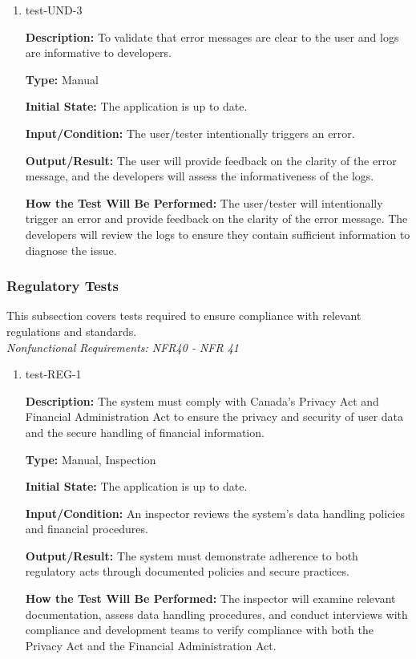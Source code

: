 \documentclass[12pt, titlepage]{article}
\begin{document}
\begin{enumerate}
\item{test-UND-3\\}

\textbf{Description:} To validate that error messages are clear to the user and
logs are informative to developers.

\textbf{Type:} Manual
					
\textbf{Initial State:} The application is up to date.
					
\textbf{Input/Condition:} The user/tester intentionally triggers an error.
					
\textbf{Output/Result:} The user will provide feedback on the clarity of the
error message, and the developers will assess the informativeness of the logs.
					
\textbf{How the Test Will Be Performed:} The user/tester will intentionally
trigger an error and provide feedback on the clarity of the error message. The
developers will review the logs to ensure they contain sufficient information to
diagnose the issue.

\end{enumerate}

\subsubsection{Regulatory Tests}

This subsection covers tests required to ensure compliance with relevant
regulations and standards. \\
\textit{Nonfunctional Requirements: NFR40 - NFR 41}

\begin{enumerate}

\item{test-REG-1\\}

\textbf{Description:} The system must comply with Canada's Privacy Act and
Financial Administration Act to ensure the privacy and security of user data and
the secure handling of financial information.

\textbf{Type:} Manual, Inspection
					
\textbf{Initial State:} The application is up to date.
					
\textbf{Input/Condition:} An inspector reviews the system's data handling
policies and financial procedures.
					
\textbf{Output/Result:} The system must demonstrate adherence to both regulatory
acts through documented policies and secure practices.
					
\textbf{How the Test Will Be Performed:} The inspector will examine relevant
documentation, assess data handling procedures, and conduct interviews with
compliance and development teams to verify compliance with both the Privacy Act
and the Financial Administration Act.

\end{enumerate}
\end{document}
